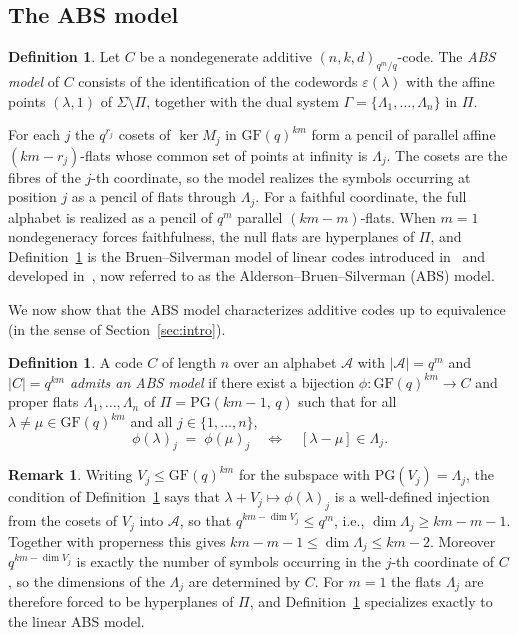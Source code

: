 \documentclass[12pt]{article}
\theoremstyle{definition}
\newtheorem{defn}[thm]{Definition}
\newtheorem{rem}[thm]{Remark}
\numberwithin{equation}{section}
\newcommand{\A}{\mathcal{A}}
\newcommand{\la}{\lambda}
\newcommand{\GF}[1]{\mathrm{GF}(#1)}
\newcommand{\PG}[2]{\mathrm{PG}(#1,\,#2)}
\newcommand{\PGv}[1]{\mathrm{PG}(#1)}
\begin{document}
\subsection*{The ABS model}

\begin{defn}\label{defn:ABSmodel}
Let $C$ be a nondegenerate additive $(n,k,d)_{q^m/q}$-code.  The \textit{ABS model} of $C$ consists of the identification of the codewords $\varepsilon(\la)$ with the affine points $(\la,1)$ of $\Sigma\setminus\Pi$, together with the dual system $\Gamma=\{\Lambda_1,\ldots,\Lambda_n\}$ in $\Pi$.
\end{defn}

For each $j$ the $q^{r_j}$ cosets of $\ker M_j$ in $\GF{q}^{km}$ form a pencil of parallel affine $(km-r_j)$-flats whose common set of points at infinity is $\Lambda_j$. The cosets are the fibres of the $j$-th coordinate, so the model realizes the symbols occurring at position $j$ as a pencil of flats through $\Lambda_j$. For a faithful coordinate, the full alphabet is realized as a pencil of $q^m$ parallel $(km-m)$-flats.  When $m=1$ nondegeneracy forces faithfulness, the null flats are hyperplanes of $\Pi$, and Definition~\ref{defn:ABSmodel} is the Bruen--Silverman model of linear codes introduced in~\cite{ALD} and developed in~\cite{AB1,AB3}, now referred to as the Alderson--Bruen--Silverman (ABS) model.

We now show that the ABS model characterizes additive codes up to equivalence (in the sense of Section~\ref{sec:intro}).

\begin{defn}\label{defn:admitsABS}
A code $C$ of length $n$ over an alphabet $\A$ with $|\A|=q^m$ and $|C|=q^{km}$ \textit{admits an ABS model} if there exist a bijection $\phi:\GF{q}^{km}\to C$ and proper flats $\Lambda_1,\ldots,\Lambda_n$ of $\Pi=\PG{km-1}{q}$ such that for all $\la\neq\mu\in\GF{q}^{km}$ and all $j\in\{1,\ldots,n\}$,
\[
  \phi(\la)_j \;=\; \phi(\mu)_j  \quad\Longleftrightarrow\quad  [\la-\mu]\in \Lambda_j.
\]
\end{defn}

\begin{rem}\label{rem:dimforced}
Writing $V_j\le\GF{q}^{km}$ for the subspace with $\PGv{V_j}=\Lambda_j$, the condition of Definition~\ref{defn:admitsABS} says that $\la+V_j\mapsto\phi(\la)_j$ is a well-defined injection from the cosets of $V_j$ into $\A$, so that $q^{km-\dim V_j}\le q^m$, i.e., $\dim \Lambda_j\ge km-m-1$.  Together with properness this gives $km-m-1\le\dim \Lambda_j\le km-2$.  Moreover $q^{km-\dim V_j}$ is exactly the number of symbols occurring in the $j$-th coordinate of $C$, so the dimensions of the $\Lambda_j$ are determined by $C$.  For $m=1$ the flats $\Lambda_j$ are therefore forced to be hyperplanes of $\Pi$, and Definition~\ref{defn:admitsABS} specializes exactly to the linear ABS model.
\end{rem}
\end{document}
